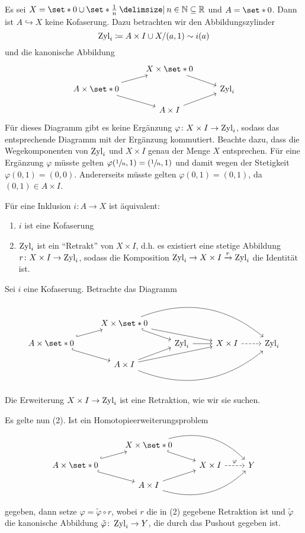\begin{beispiel}[{name=[{Inklusion, die keine Kofaserung ist}]}]
	Es sei $X = \set*{0} \cup \set*{\frac{1}{n} \given n \in \mathbb{N}} \subseteq \mathbb{R}$ und $A = \set*{0}$.
	Dann ist $A \hookrightarrow X$ keine Kofaserung.
	Dazu betrachten wir den Abbildungszylinder 
	\[
		\operatorname{Zyl}_i \coloneqq A \times I \cup X / (a,1) \sim i(a)
	\]
	und die kanonische Abbildung
	\[
		\begin{tikzcd}[row sep=small]
			& X \times \set*{0}   \drar \\
			A \times \set*{0} \urar \drar& & \Zyl_i  \\
			& A \times I \urar
		\end{tikzcd}
	\]
	Für dieses Diagramm gibt es keine Ergänzung $\varphi \colon X \times I \to \operatorname{Zyl}_i$, sodass das entsprechende Diagramm mit der Ergänzung kommutiert.
	Beachte dazu, dass die Wegekomponenten von $\operatorname{Zyl}_i$ und $X \times I$ genau der Menge $X$ entsprechen.
	Für eine Ergänzung $\varphi$ müsste gelten $\varphi(\sfrac{1}{n},1) = (\sfrac{1}{n},1)$ und damit wegen der Stetigkeit $\varphi(0,1)=(0,0)$.
	Andererseits müsste gelten $\varphi(0,1) = (0,1)$, da $(0,1) \in A \times I$.
\end{beispiel}

\begin{satz}[{name=[Wann sind Inklusionen Kofaserungen]}]
	Für eine Inklusion $i \colon A \to X$ ist äquivalent:
	\begin{enumerate}[(1)]
		\item $i$ ist eine Kofaserung
		\item $\operatorname{Zyl}_i$ ist ein \enquote{Retrakt} von $X \times I$, d.h. es existiert eine stetige Abbildung $r \colon X \times I \to \operatorname{Zyl}_i$, sodass die Komposition $\operatorname{Zyl}_i \to X \times I \xrightarrow{r} \operatorname{Zyl}_i$ die Identität ist.
	\end{enumerate}
\end{satz}
\begin{beweis}
	Sei $i$ eine Kofaserung.
	Betrachte das Diagramm
	\[
		\begin{tikzcd}[row sep=small]
			& X \times \set*{0}  \drar[hook] \ar[rrd] \ar[rrrd,bend left] \\
			A \times \set*{0} \urar[hook] \drar[hook] & & \Zyl_i \rar & X \times I \rar[dashed] & \Zyl_i  \\
			& A \times I \urar \ar[urr] \ar[urrr,bend right]
		\end{tikzcd}
	\]
	Die Erweiterung $X \times I \to \operatorname{Zyl}_i$ ist eine Retraktion, wie wir sie suchen.
	
	Es gelte nun (2).
	Ist ein Homotopieerweiterungsproblem
	\[
		\begin{tikzcd}[row sep=small]
			& X \times \set*{0}  \drar[hook] \ar[rrd,bend left] \\
			A \times \set*{0} \urar[hook] \drar[hook] & & X \times I \rar[dashed,"\varphi"] & Y \\
			& A \times I \urar \ar[urr,bend right]
		\end{tikzcd}
	\]
	gegeben, dann setze $\varphi = \tilde{\varphi} \circ r$, wobei $r$ die in (2) gegebene Retraktion ist und $\tilde{\varphi}$ die kanonische Abbildung $\tilde{\varphi} \colon \operatorname{Zyl}_i \to Y$, die durch das Pushout gegeben ist.
\end{beweis}

